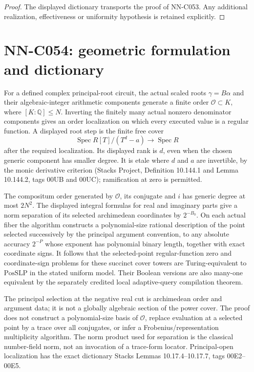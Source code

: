 \begin{proof} The displayed dictionary transports the proof of NN-C053. Any additional realization, effectiveness or uniformity hypothesis is retained explicitly.\end{proof}


\section{NN-C054: geometric formulation and dictionary}
\begin{geometricstatement}[NN-C054]
For a defined complex principal-root circuit, the actual scaled roots
$\gamma=B\alpha$ and their algebraic-integer arithmetic components
generate a finite order $\mathcal O\subset K$, where
$[K:\mathbb Q]\le N$.  Inverting the finitely many actual nonzero
denominator components gives an order localization on which every
executed value is a regular function.  A displayed root step is the
finite free cover
\[
 \operatorname{Spec}R[T]/(T^d-a)\longrightarrow\operatorname{Spec}R
\]
after the required localization.  Its displayed rank is $d$, even
when the chosen generic component has smaller degree.  It is etale
where $d$ and $a$ are invertible, by the monic derivative criterion
(Stacks Project, Definition 10.144.1 and Lemma 10.144.2,
tags 00UB and 00UC); ramification at zero is permitted.

The compositum order generated by $\mathcal O$, its conjugate and $i$
has generic degree at most $2N^2$.  The displayed integral formulas
for real and imaginary parts give a norm separation of its selected
archimedean coordinates by $2^{-B_0}$.  On each actual fiber the
algorithm constructs a polynomial-size rational description of the
point selected successively by the principal argument convention,
to any absolute accuracy $2^{-P}$ whose exponent has polynomial
binary length, together with exact coordinate signs.  It follows
that the selected-point regular-function zero and coordinate-sign
problems for these succinct cover towers are Turing-equivalent to
$\mathrm{PosSLP}$ in the stated uniform model.
Their Boolean versions are also many-one equivalent by the separately
credited local adaptive-query compilation theorem.

The principal selection at the negative real cut is archimedean
order and argument data; it is not a globally algebraic section of
the power cover.  The proof does not construct a polynomial-size
basis of $\mathcal O$, replace evaluation at a selected point by a
trace over all conjugates, or infer a Frobenius/representation
multiplicity algorithm.  The norm product used for separation is
the classical number-field norm, not an invocation of a trace-form
locator.  Principal-open localization has the exact dictionary
Stacks Lemmas 10.17.4--10.17.7, tags 00E2--00E5.


\end{geometricstatement}
